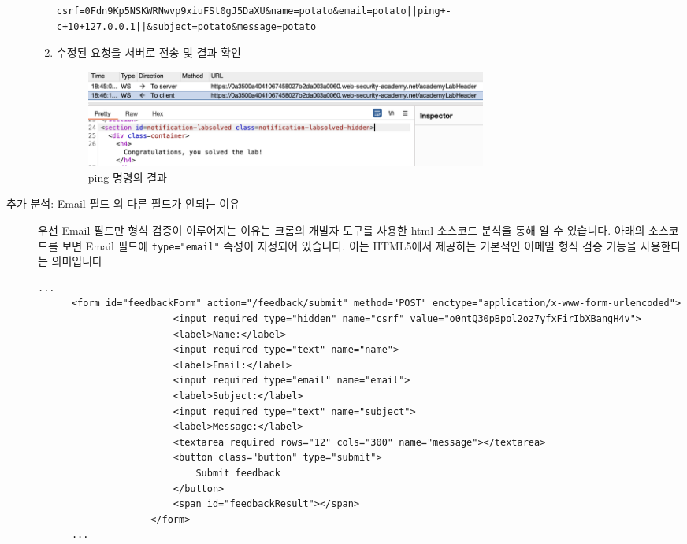 \documentclass{article}
\begin{document}
\begin{description}
\begin{enumerate}
\begin{lstlisting}[label={lst:modified-request},caption={변동된 요청 (modified request)}]
      csrf=0Fdn9Kp5NSKWRNwvp9xiuFSt0gJ5DaXU&name=potato&email=potato||ping+-c+10+127.0.0.1||&subject=potato&message=potato
      \end{lstlisting}
      \item 수정된 요청을 서버로 전송 및 결과 확인
      \begin{figure}[htbp]
      \centering
      \includegraphics[width=0.7\textwidth]{../figure/figure4.png}
      \caption{ping 명령의 결과}
      \label{fig:ping-result}
      \end{figure}

    \end{enumerate}

    \newpage
    \item[추가 분석: Email 필드 외 다른 필드가 안되는 이유]\leavevmode\par
    우선 Email 필드만 형식 검증이 이루어지는 이유는 크롬의 개발자 도구를 사용한 html 소스코드 분석을 통해 알 수 있습니다. 아래의 소스코드를 보면 
    Email 필드에 \texttt{type="email"} 속성이 지정되어 있습니다. 이는 HTML5에서 제공하는 기본적인 이메일 형식 검증 기능을 사용한다는 의미입니다

    \begin{lstlisting}[label={lst:modified-request},caption={피드백 폼의 HTML 소스 코드}]
      ...
      <form id="feedbackForm" action="/feedback/submit" method="POST" enctype="application/x-www-form-urlencoded">
                        <input required type="hidden" name="csrf" value="o0ntQ30pBpol2oz7yfxFirIbXBangH4v">
                        <label>Name:</label>
                        <input required type="text" name="name">
                        <label>Email:</label>
                        <input required type="email" name="email">
                        <label>Subject:</label>
                        <input required type="text" name="subject">
                        <label>Message:</label>
                        <textarea required rows="12" cols="300" name="message"></textarea>
                        <button class="button" type="submit">
                            Submit feedback
                        </button>
                        <span id="feedbackResult"></span>
                    </form>
      ...
    \end{lstlisting}


\end{description}
\end{document}
